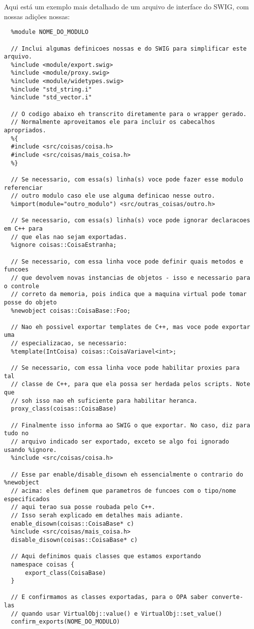   Aqui está um exemplo mais detalhado de um arquivo de interface do SWIG, com nossas 
  adições nossas:
  \vspace{1em}
  \begin{lstlisting}
  %module NOME_DO_MODULO

  // Inclui algumas definicoes nossas e do SWIG para simplificar este arquivo.
  %include <module/export.swig>
  %include <module/proxy.swig>
  %include <module/widetypes.swig>
  %include "std_string.i"
  %include "std_vector.i"
  
  // O codigo abaixo eh transcrito diretamente para o wrapper gerado.
  // Normalmente aproveitamos ele para incluir os cabecalhos apropriados.
  %{
  #include <src/coisas/coisa.h>
  #include <src/coisas/mais_coisa.h>
  %}

  // Se necessario, com essa(s) linha(s) voce pode fazer esse modulo referenciar 
  // outro modulo caso ele use alguma definicao nesse outro.
  %import(module="outro_modulo") <src/outras_coisas/outro.h>

  // Se necessario, com essa(s) linha(s) voce pode ignorar declaracoes em C++ para 
  // que elas nao sejam exportadas.
  %ignore coisas::CoisaEstranha;
  
  // Se necessario, com essa linha voce pode definir quais metodos e funcoes
  // que devolvem novas instancias de objetos - isso e necessario para o controle 
  // correto da memoria, pois indica que a maquina virtual pode tomar posse do objeto
  %newobject coisas::CoisaBase::Foo;
  
  // Nao eh possivel exportar templates de C++, mas voce pode exportar uma 
  // especializacao, se necessario:
  %template(IntCoisa) coisas::CoisaVariavel<int>;

  // Se necessario, com essa linha voce pode habilitar proxies para tal 
  // classe de C++, para que ela possa ser herdada pelos scripts. Note que
  // soh isso nao eh suficiente para habilitar heranca.
  proxy_class(coisas::CoisaBase)

  // Finalmente isso informa ao SWIG o que exportar. No caso, diz para tudo no
  // arquivo indicado ser exportado, exceto se algo foi ignorado usando %ignore.
  %include <src/coisas/coisa.h>
  
  // Esse par enable/disable_disown eh essencialmente o contrario do %newobject
  // acima: eles definem que parametros de funcoes com o tipo/nome especificados
  // aqui terao sua posse roubada pelo C++. 
  // Isso serah explicado em detalhes mais adiante.
  enable_disown(coisas::CoisaBase* c)
  %include <src/coisas/mais_coisa.h>
  disable_disown(coisas::CoisaBase* c)

  // Aqui definimos quais classes que estamos exportando
  namespace coisas {
      export_class(CoisaBase)
  }

  // E confirmamos as classes exportadas, para o OPA saber converte-las
  // quando usar VirtualObj::value() e VirtualObj::set_value()
  confirm_exports(NOME_DO_MODULO)
  \end{lstlisting}
  
